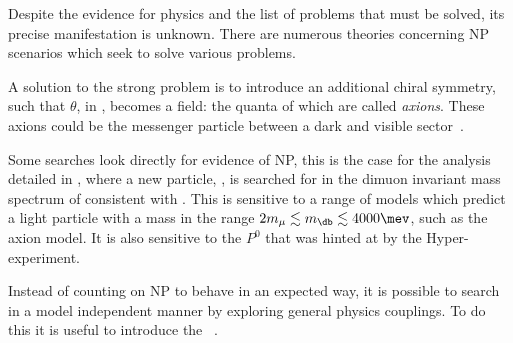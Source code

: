 Despite the evidence for \bsm physics and the list of problems that must be solved, its precise
manifestation is unknown.
There are numerous theories concerning NP scenarios which seek to solve various problems.

A solution to the strong \CP problem is to introduce an additional chiral symmetry, such that
$\theta$, in , becomes a field: the quanta of which are called \emph{axions}.
These axions could be the messenger particle between a dark and visible
sector~\cite{Peccei:2006as}.











Some searches look directly for evidence of NP, this is the case for the analysis detailed in
, where a new particle, \db, is searched for in the dimuon invariant mass spectrum of
\decay{\Bd}{\Kstarent\mumu} consistent with \decay{\db}{\mumu}.
This is sensitive to a range of models which predict a light particle with a mass in the range
$2m_\mu\lesssim m_\db\lesssim4000\mev$, such as the axion model.
It is also sensitive to the $P^0$ that was hinted at by the Hyper-\CP experiment.

Instead of counting on NP to behave in an expected way, it is possible to search in a model
independent manner by exploring general physics couplings.
To do this it is useful to introduce the \OPE~\cite{PhysRev.179.1499}.


